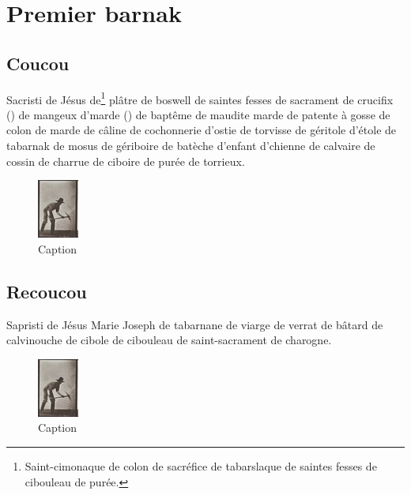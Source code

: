 
\section{Premier barnak}
\subsection{Coucou}
Sacristi de Jésus de\footnote{Saint-cimonaque de colon de sacréfice de tabarslaque de saintes fesses de cibouleau de purée.} plâtre de boswell de saintes fesses de sacrament de crucifix () de mangeux d'marde () de baptême de maudite marde de patente à gosse de colon de marde de câline de cochonnerie d'ostie de torvisse de géritole d'étole de tabarnak de mosus de gériboire de batèche d'enfant d'chienne de calvaire de cossin de charrue de ciboire de purée de torrieux.

\begin{figure}[!h]
    \centering
    \includegraphics[width=.25\textwidth]{Introduction/stop1.png}
    \caption{Caption}
    \label{fig:antan}
\end{figure}

\subsection{Recoucou}
Sapristi de Jésus Marie Joseph de tabarnane de viarge de verrat de bâtard de calvinouche de cibole de cibouleau de saint-sacrament de charogne.

\begin{figure}[!h]
    \centering
    \includegraphics[width=.25\textwidth]{Introduction/stop1.png}
    \caption{Caption}
    \label{fig:pieux}
\end{figure}